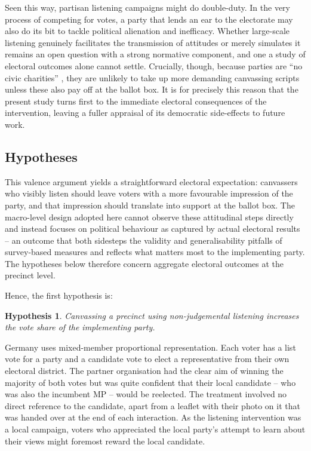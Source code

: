 \documentclass[11pt,a4paper]{scrartcl}
\newtheorem{hyp}{Hypothesis}
\begin{document}
Seen this way, partisan listening campaigns might do double-duty. In the very process of competing for votes, a party that lends an ear to the electorate may also do its bit to tackle political alienation and inefficacy. Whether large-scale listening genuinely facilitates the transmission of attitudes or merely simulates it remains an open question with a strong normative component, and one a study of electoral outcomes alone cannot settle. Crucially, though, because parties are \enquote{no civic charities} \autocite{foosPartiesAreNo2018}, they are unlikely to take up more demanding canvassing scripts unless these also pay off at the ballot box. It is for precisely this reason that the present study turns first to the immediate electoral consequences of the intervention, leaving a fuller appraisal of its democratic side-effects to future work.


\subsection{Hypotheses}

This valence argument yields a straightforward electoral expectation: canvassers who visibly listen should leave voters with a more favourable impression of the party, and that impression should translate into support at the ballot box.
The macro-level design adopted here cannot observe these attitudinal steps directly and instead focuses on political behaviour as captured by actual electoral results -- an outcome that both sidesteps the validity and generalisability pitfalls of survey-based measures and reflects what matters most to the implementing party. The hypotheses below therefore concern aggregate electoral outcomes at the precinct level.

Hence, the first hypothesis is:

\begin{hyp}\label{h:green_zweit}
	Canvassing a precinct using non-judgemental listening increases the vote share of the implementing party.
\end{hyp}

Germany uses mixed-member proportional representation. Each voter has a list vote for a party and a candidate vote to elect a representative from their own electoral district. The partner organisation had the clear aim of winning the majority of both votes but was quite confident that their local candidate -- who was also the incumbent MP -- would be reelected. The treatment involved no direct reference to the candidate, apart from a leaflet with their photo on it that was handed over at the end of each interaction. As the listening intervention was a local campaign, voters who appreciated the local party's attempt to learn about their views might foremost reward the local candidate.
\end{document}
